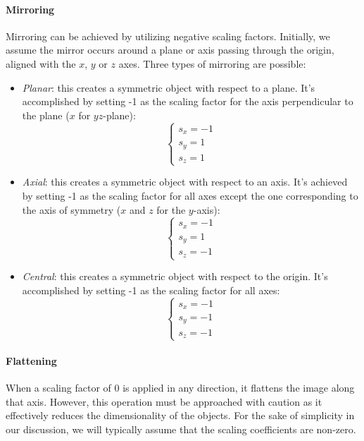 \paragraph*{Mirroring}
Mirroring can be achieved by utilizing negative scaling factors.
Initially, we assume the mirror occurs around a plane or axis passing through the origin, aligned with the $x$, $y$ or $z$ axes.
Three types of mirroring are possible:
\begin{itemize}
    \item \textit{Planar}: this creates a symmetric object with respect to a plane. 
        It's accomplished by setting -1 as the scaling factor for the axis perpendicular to the plane ($x$ for $yz$-plane): 
        \[\begin{cases}
            s_x = -1 \\ 
            s_y = 1  \\ 
            s_z = 1 
        \end{cases}\]
    \item \textit{Axial}: this creates a symmetric object with respect to an axis. 
        It's achieved by setting -1 as the scaling factor for all axes except the one corresponding to the axis of symmetry ($x$ and $z$ for the $y$-axis): 
        \[\begin{cases}
            s_x = -1 \\ 
            s_y = 1  \\ 
            s_z = -1 
        \end{cases}\]
    \item \textit{Central}: this creates a symmetric object with respect to the origin. 
        It's accomplished by setting -1 as the scaling factor for all axes:
        \[\begin{cases}
            s_x = -1 \\ 
            s_y = -1 \\ 
            s_z = -1 
        \end{cases}\]
\end{itemize}

\paragraph*{Flattening}
When a scaling factor of 0 is applied in any direction, it flattens the image along that axis. 
However, this operation must be approached with caution as it effectively reduces the dimensionality of the objects.
For the sake of simplicity in our discussion, we will typically assume that the scaling coefficients are non-zero.


